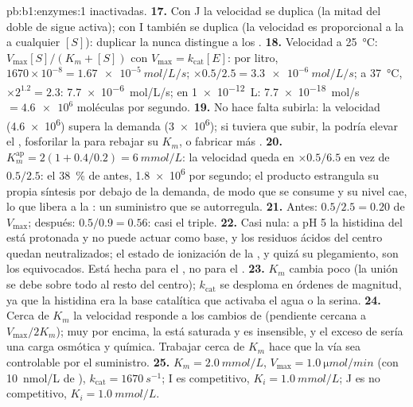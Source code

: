 \begin{solution}{pb:b1:enzymes:1}
inactivadas.
\textbf{17.} Con J la velocidad se duplica (la mitad del doble de 
sigue activa); con I también se duplica (la velocidad es proporcional a la
 a cualquier $[S]$): duplicar la  nunca distingue a los
.
\textbf{18.} Velocidad a \qty{25}{\celsius}: $V_{\max}[S]/(K_m + [S])$ con
$V_{\max} = k_{\text{cat}}[E]$: por litro, $1670\times 10^{-8} =
\qty{1.67e-5}{mol/L/s}$; $\times 0.5/2.5 = \qty{3.3e-6}{mol/L/s}$; a
\qty{37}{\celsius}, $\times 2^{1.2} = 2.3$: \qty{7.7e-6}{mol/L/s}; en
\qty{1e-12}{L}: \qty{7.7e-18}{mol/s} $= \num{4.6e6}$ moléculas por
segundo.
\textbf{19.} No hace falta subirla: la velocidad (\num{4.6e6}) supera la
demanda (\num{3e6}); si tuviera que subir, la  podría elevar el
, fosforilar la  para rebajar su $K_m$, o fabricar más
.
\textbf{20.} $K_m^{\text{ap}} = 2(1 + 0.4/0.2) = \qty{6}{mmol/L}$: la
velocidad queda en $\times 0.5/6.5$ en vez de $0.5/2.5$: el \qty{38}{\%} de
antes, \num{1.8e6} por segundo; el producto estrangula su propia síntesis
por debajo de la demanda, de modo que se consume y su nivel cae, lo que
libera a la : un suministro que se autorregula.
\textbf{21.} Antes: $0.5/2.5 = 0.20$ de $V_{\max}$; después: $0.5/0.9 =
0.56$: casi el triple.
\textbf{22.} Casi nula: a pH 5 la histidina del  está protonada
y no puede actuar como base, y los residuos ácidos del centro quedan
neutralizados; el estado de ionización de la , y quizá su plegamiento,
son los equivocados. Está hecha para el , no para el .
\textbf{23.} $K_m$ cambia poco (la unión se debe sobre todo al resto del
centro); $k_{\text{cat}}$ se desploma en órdenes de magnitud, ya que la
histidina era la base catalítica que activaba el agua o la serina.
\textbf{24.} Cerca de $K_m$ la velocidad responde a los cambios de 
(pendiente cercana a $V_{\max}/2K_m$); muy por encima, la  está
saturada y es insensible, y el exceso de  sería una carga osmótica y
química. Trabajar cerca de $K_m$ hace que la vía sea controlable por el
suministro.
\textbf{25.} $K_m = \qty{2.0}{mmol/L}$, $V_{\max} = \qty{1.0}{\micro mol/min}$
(con \qty{10}{nmol/L} de ), $k_{\text{cat}} = \qty{1670}{s^{-1}}$; I
es competitivo, $K_i = \qty{1.0}{mmol/L}$; J es no competitivo,
$K_i =
\qty{1.0}{mmol/L}$.
\end{solution}
